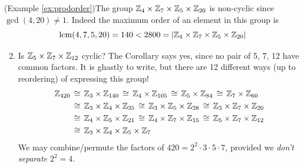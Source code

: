 \begin{examples}{}{}
	\exstart (Example \ref{ex:prodorder})\lstsp The group $\mathbb{Z}_4\times\mathbb{Z}_7\times\mathbb{Z}_5\times\mathbb{Z}_{20}$ is non-cyclic since $\gcd(4,20)\neq 1$. Indeed the maximum order of an element in this group is
	\[
		\operatorname{lcm}(4,7,5,20)=140<2800=\left| \mathbb{Z}_4\times\mathbb{Z}_7\times\mathbb{Z}_5\times\mathbb{Z}_{20}\right|
	\]
	\begin{enumerate}\setcounter{enumi}{1}
	  \item Is $\mathbb{Z}_5\times\mathbb{Z}_7\times\mathbb{Z}_{12}$ cyclic? The Corollary says yes, since no pair of 5, 7, 12 have common factors. It is ghastly to write, but there are 12 different ways (up to reordering) of expressing this group!
		\begin{align*}
			\mathbb{Z}_{420}\,&\cong\, \mathbb{Z}_3\times\mathbb{Z}_{140} \,\cong\, \mathbb{Z}_4\times\mathbb{Z}_{105} \,\cong\, \mathbb{Z}_5\times\mathbb{Z}_{84} \,\cong\, \mathbb{Z}_{7}\times\mathbb{Z}_{60}\\
			&\cong\, \mathbb{Z}_3\times\mathbb{Z}_4\times\mathbb{Z}_{35} \,\cong\, \mathbb{Z}_3\times\mathbb{Z}_5\times\mathbb{Z}_{28} \,\cong\, \mathbb{Z}_3\times\mathbb{Z}_7\times\mathbb{Z}_{20}\\
			&\cong\, \mathbb{Z}_4\times\mathbb{Z}_5\times\mathbb{Z}_{21} \,\cong\, \mathbb{Z}_4\times\mathbb{Z}_7\times\mathbb{Z}_{15} \,\cong\, \mathbb{Z}_5\times\mathbb{Z}_7\times\mathbb{Z}_{12}\\
			&\cong\, \mathbb{Z}_3\times\mathbb{Z}_4\times\mathbb{Z}_5\times\mathbb{Z}_7
		\end{align*}
		We may combine/permute the factors of $420=2^2\cdot 3\cdot 5\cdot 7$, provided we \emph{don't separate $2^2=4$.}
  
	\end{enumerate}
\end{examples}


